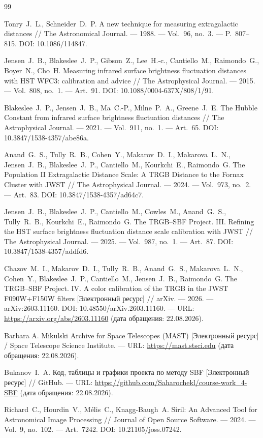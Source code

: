 \begin{thebibliography}{99}

Tonry~J.~L., Schneider~D.~P. A new technique for measuring extragalactic distances // The Astronomical Journal. --- 1988. --- Vol.~96, no.~3. --- P.~807--815. DOI: 10.1086/114847.

Jensen~J.~B., Blakeslee~J.~P., Gibson~Z., Lee~H.-c., Cantiello~M., Raimondo~G., Boyer~N., Cho~H. Measuring infrared surface brightness fluctuation distances with HST WFC3: calibration and advice // The Astrophysical Journal. --- 2015. --- Vol.~808, no.~1. --- Art.~91. DOI: 10.1088/0004-637X/808/1/91.

Blakeslee~J.~P., Jensen~J.~B., Ma~C.-P., Milne~P.~A., Greene~J.~E. The Hubble Constant from infrared surface brightness fluctuation distances // The Astrophysical Journal. --- 2021. --- Vol.~911, no.~1. --- Art.~65. DOI: 10.3847/1538-4357/abe86a.

Anand~G.~S., Tully~R.~B., Cohen~Y., Makarov~D.~I., Makarova~L.~N., Jensen~J.~B., Blakeslee~J.~P., Cantiello~M., Kourkchi~E., Raimondo~G. The Population II Extragalactic Distance Scale: A TRGB Distance to the Fornax Cluster with JWST // The Astrophysical Journal. --- 2024. --- Vol.~973, no.~2. --- Art.~83. DOI: 10.3847/1538-4357/ad64c7.

Jensen~J.~B., Blakeslee~J.~P., Cantiello~M., Cowles~M., Anand~G.~S., Tully~R.~B., Kourkchi~E., Raimondo~G. The TRGB--SBF Project. III. Refining the HST surface brightness fluctuation distance scale calibration with JWST // The Astrophysical Journal. --- 2025. --- Vol.~987, no.~1. --- Art.~87. DOI: 10.3847/1538-4357/addfd6.

Chazov~M.~I., Makarov~D.~I., Tully~R.~B., Anand~G.~S., Makarova~L.~N., Cohen~Y., Blakeslee~J.~P., Cantiello~M., Jensen~J.~B., Raimondo~G. The TRGB--SBF Project. IV. A color calibration of the TRGB in the JWST F090W+F150W filters [Электронный ресурс] // arXiv. --- 2026. --- arXiv:2603.11160. DOI: 10.48550/arXiv.2603.11160. --- URL: \url{https://arxiv.org/abs/2603.11160} (дата обращения: 22.08.2026).

Barbara A. Mikulski Archive for Space Telescopes (MAST) [Электронный ресурс] / Space Telescope Science Institute. --- URL: \url{https://mast.stsci.edu} (дата обращения: 22.08.2026).

Bukanov~I.~A. Код, таблицы и графики проекта по методу SBF [Электронный ресурс] // GitHub. --- URL: \url{https://github.com/Saharochekl/course-work_4-SBF} (дата обращения: 22.08.2026).

Richard~C., Hourdin~V., M\'elis~C., Knagg-Baugh~A. Siril: An Advanced Tool for Astronomical Image Processing // Journal of Open Source Software. --- 2024. --- Vol.~9, no.~102. --- Art.~7242. DOI: 10.21105/joss.07242.

\end{thebibliography}
